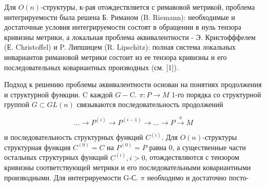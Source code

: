 \documentclass[10pt]{article}
\begin{document}
Для $O(n)$-структуры, к-рая отождествляется с римавовой метрикой, проблема интегрируемости была решена Б. Риманом (B. Riemann): необходимые и достаточные условия интегрируемости состоят в обращении в нуль тензора кривизны метрики, а локальная проблема әквивалентности - Э. Кристофффелем (Е. Christoffel) и P. Липшицем (R. Lipschitz): полная система локальных инвариантов римановой метрики состоит из ее тензора кривизны и его последовательных ковариантных производных (см. [1]).



Подход к решению проблемы әквивалентности основан на понятиях продолжения и структурной функции. $\mathrm{C}$ каждой $G-\mathrm{C}$. $\pi: P \rightarrow M$ 1-го порядка со структурной группой $G \subset G L(n)$ связываются последовательность продолжений



\[

\ldots \longrightarrow P^{(i)} \longrightarrow P^{(i-1)} \longrightarrow \ldots \longrightarrow P \stackrel{\pi}{\longrightarrow} M

\]



и последовательность структурных функций $C^{(i)}$. Для $O(n)$-структуры структурная функция $C^{(0)}=C$ на $P^{(0)}=P$ равна 0, а существенные части остальных структурных функций $C^{(i)}, i>0$, отождествляются с тензором кривизны соответствующей метрики и его последовательными ковариантными производными. Для интегрируемости G-С. $\pi$ необходимо и достаточно посто-
\end{document}
